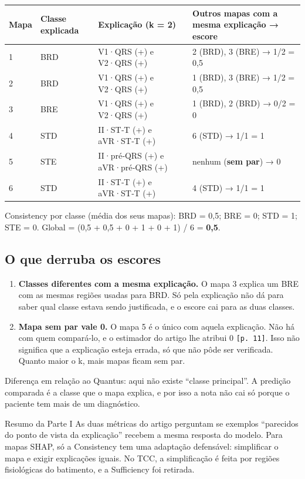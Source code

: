 \documentclass[11pt,a4paper]{article}
\begin{document}
\begin{center}\small
\begin{tabularx}{\linewidth}{lllX}
\toprule
\textbf{Mapa} & \textbf{Classe explicada} & \textbf{Explicação (k = 2)} & \textbf{Outros mapas com a mesma explicação → escore} \\
\midrule
1 & BRD & V1·QRS (+) e V2·QRS (+) & 2 (BRD), 3 (BRE) → 1/2 = 0,5 \\
2 & BRD & V1·QRS (+) e V2·QRS (+) & 1 (BRD), 3 (BRE) → 1/2 = 0,5 \\
3 & BRE & V1·QRS (+) e V2·QRS (+) & 1 (BRD), 2 (BRD) → 0/2 = 0 \\
4 & STD & II·ST‑T (+) e aVR·ST‑T (+) & 6 (STD) → 1/1 = 1 \\
5 & STE & II·pré‑QRS (+) e aVR·pré‑QRS (+) & nenhum (\textbf{sem par}) → 0 \\
6 & STD & II·ST‑T (+) e aVR·ST‑T (+) & 4 (STD) → 1/1 = 1 \\
\bottomrule
\end{tabularx}
\end{center}

Consistency por classe (média dos seus mapas): BRD = 0,5; BRE = 0; STD = 1; STE = 0. Global = (0,5 + 0,5 + 0 + 1 + 0 + 1) / 6 = \textbf{0,5}.

\subsection{O que derruba os escores}
\begin{enumerate}
\item \textbf{Classes diferentes com a mesma explicação.} O mapa 3 explica um BRE com as mesmas regiões usadas para BRD. Só pela explicação não dá para saber qual classe estava sendo justificada, e o escore cai para as duas classes.
\item \textbf{Mapa sem par vale 0.} O mapa 5 é o único com aquela explicação. Não há com quem compará-lo, e o estimador do artigo lhe atribui 0 \texttt{[p. 11]}. Isso não significa que a explicação esteja errada, só que não pôde ser verificada. Quanto maior o k, mais mapas ficam sem par.
\end{enumerate}

Diferença em relação ao Quantus: aqui não existe “classe principal”. A predição comparada é a classe que o mapa explica, e por isso a nota não cai só porque o paciente tem mais de um diagnóstico.

\begin{infobox}[ok]{Resumo da Parte I}
As duas métricas do artigo perguntam se exemplos “parecidos do ponto de vista da explicação” recebem a mesma resposta do modelo. Para mapas SHAP, só a Consistency tem uma adaptação defensável: simplificar o mapa e exigir explicações iguais. No TCC, a simplificação é feita por regiões fisiológicas do batimento, e a Sufficiency foi retirada.
\end{infobox}
\end{document}
